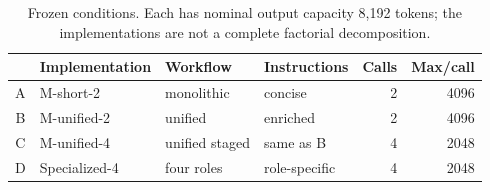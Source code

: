 \begin{table}[t]
\centering
\begin{tabular}{@{}clllrr@{}}
\toprule
 & Implementation & Workflow & Instructions & Calls & Max/call \\
\midrule
A & M-short-2 & monolithic & concise & 2 & 4096 \\
B & M-unified-2 & unified & enriched & 2 & 4096 \\
C & M-unified-4 & unified staged & same as B & 4 & 2048 \\
D & Specialized-4 & four roles & role-specific & 4 & 2048 \\
\bottomrule
\end{tabular}
\caption{Frozen conditions.  Each has nominal output capacity 8,192 tokens;
the implementations are not a complete factorial decomposition.}
\label{tab:conditions}
\end{table}
